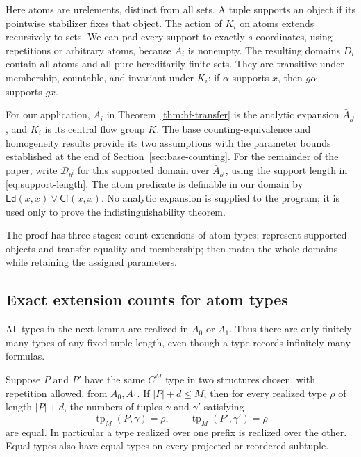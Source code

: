 Here atoms are urelements, distinct from all sets.  A tuple supports an
object if its pointwise stabilizer fixes that object.  The action of $K_i$
on atoms extends recursively to sets.  We can pad every support to exactly
$s$ coordinates, using repetitions or arbitrary atoms, because $A_i$ is
nonempty.  The resulting domains $D_i$ contain all atoms and all pure
hereditarily finite sets.  They are transitive under membership, countable,
and invariant under $K_i$: if $\alpha$ supports $x$, then $g\alpha$
supports $gx$.

For our application, $A_i$ in Theorem~\ref{thm:hf-transfer} is the analytic
expansion $\bar A_{b^i}$, and $K_i$ is its central flow group $K$.  The base
counting-equivalence and homogeneity results provide its two assumptions
with the parameter bounds established at the end of
Section~\ref{sec:base-counting}. For the remainder of the paper, write
$\mathcal D_{b^i}$ for this supported
domain over $\bar A_{b^i}$, using the support length in
\eqref{eq:support-length}. The atom predicate is definable in our domain by
$\mathsf{Ed}(x,x)\lor\mathsf{Cf}(x,x)$.  No analytic expansion is supplied
to the program; it is used only to prove the indistinguishability theorem.

The proof has three stages: count extensions of atom types; represent
supported objects and transfer equality and membership; then match the
whole domains while retaining the assigned parameters.

\subsection{Exact extension counts for atom types}

All types in the next lemma are realized in $A_0$ or $A_1$.  Thus there are
only finitely many types of any fixed tuple length, even though a type
records infinitely many formulas.

\begin{lemma}
\label{lem:hf-type-counts}
Suppose $P$ and $P'$ have the same $C^M$ type in two structures chosen,
with repetition allowed, from $A_0,A_1$.  If $|P|+d\leq M$, then for every
realized type $\rho$ of length $|P|+d$, the numbers of tuples $\gamma$
and $\gamma'$ satisfying
\[
 \operatorname{tp}_M(P,\gamma)=\rho,
 \qquad
 \operatorname{tp}_M(P',\gamma')=\rho
\]
are equal.  In particular a type realized over one prefix is realized over
the other.  Equal types also have equal types on every projected or
reordered subtuple.
\end{lemma}

